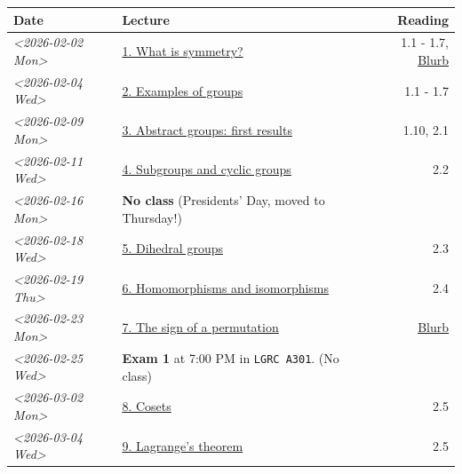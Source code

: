 \documentclass[11pt]{article}
\begin{document}
\begin{center}
\begin{tabular}{l|l|r}
\hline
Date & Lecture & Reading\\[0pt]
\hline
\textit{<2026-02-02 Mon>} & \href{https://www.dropbox.com/scl/fi/p1wxilymw0vyhqvnk3z0a/Lecture-1.pdf?rlkey=wz6pvevnvakryws6uz4t8jsgx\&st=oihmxpsu\&dl=0}{1. What is symmetry?} & 1.1 - 1.7, \href{https://kconrad.math.uconn.edu/blurbs/grouptheory/whygroups.pdf}{Blurb}\\[0pt]
\textit{<2026-02-04 Wed>} & \href{https://www.dropbox.com/scl/fi/ye5ewjg4w53js9i9nnlqp/Lecture-2.pdf?rlkey=en0vp8k0mxcdldak8rpebqe5w\&st=q1vmzgj1\&dl=0}{2. Examples of groups} & 1.1 - 1.7\\[0pt]
\textit{<2026-02-09 Mon>} & \href{https://www.dropbox.com/scl/fi/5fn0wkb6ejtsk79mqsjpc/Lecture-3.pdf?rlkey=2v43ltzmasna2gk3lyqmmoulk\&dl=0}{3. Abstract groups: first results} & 1.10, 2.1\\[0pt]
\textit{<2026-02-11 Wed>} & \href{https://www.dropbox.com/scl/fi/17ji5counqyvroky0zxh7/Lecture-4.pdf?rlkey=ihh68st77av0gy3322151n05e\&dl=0}{4. Subgroups and cyclic groups} & 2.2\\[0pt]
\textit{<2026-02-16 Mon>} & \textbf{No class} (Presidents' Day, moved to Thursday!) & \\[0pt]
\textit{<2026-02-18 Wed>} & \href{https://www.dropbox.com/scl/fi/utckf9w72zu37yaec6f8c/Lecture-5.pdf?rlkey=fe58spmzyrto2y4xmrhr1lbh3\&dl=0}{5. Dihedral groups} & 2.3\\[0pt]
\textit{<2026-02-19 Thu>} & \href{https://www.dropbox.com/scl/fi/c4bwzgfb771pt55lv5r7k/Lecture-6.pdf?rlkey=66e9htb7zs3mo0avx0w6bcezy\&dl=0}{6. Homomorphisms and isomorphisms} & 2.4\\[0pt]
\textit{<2026-02-23 Mon>} & \href{https://www.dropbox.com/scl/fi/4z4br5snua92kfmkyyqha/Lecture-7.pdf?rlkey=red8npkhxxxf51qcykp1rudpy\&dl=0}{7. The sign of a permutation} & \href{https://kconrad.math.uconn.edu/blurbs/grouptheory/sign.pdf}{Blurb}\\[0pt]
\textit{<2026-02-25 Wed>} & \textbf{Exam 1} at 7:00 PM in \texttt{LGRC A301}. (No class) & \\[0pt]
\textit{<2026-03-02 Mon>} & \href{https://www.dropbox.com/scl/fi/c49t3qqjya7v7pc29tazj/Lecture-8.pdf?rlkey=5qmji57c31u5npkxthnpqr0ya\&dl=0}{8. Cosets} & 2.5\\[0pt]
\textit{<2026-03-04 Wed>} & \href{https://www.dropbox.com/scl/fi/oxt143yka9abuh63wmpfd/Lecture-9.pdf?rlkey=iw757fm7u5t6e1jr5u2xlqy6h\&dl=0}{9. Lagrange's theorem} & 2.5\\[0pt]

\end{tabular}
\end{center}
\end{document}
